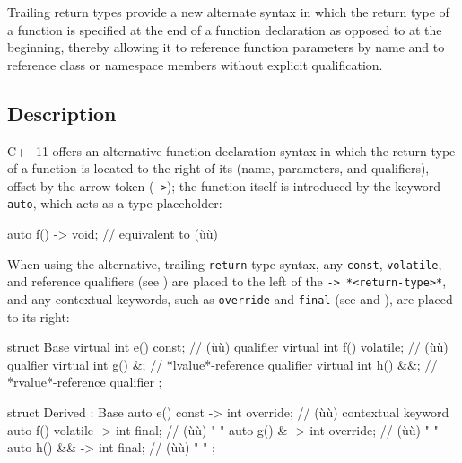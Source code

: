 
Trailing return types provide a new alternate syntax in which the return type of a function is specified at
the end of a function declaration as opposed to at the beginning,
thereby allowing it to reference function parameters by name and to reference class
or namespace members without explicit qualification.

\subsection[Description]{Description}\label{description}

C++11 offers an alternative function-declaration syntax in which the
return type of a function is located to the right of its
 (name, parameters, and qualifiers), offset by the
arrow token (\lstinline!->!); the function itself is introduced by the
keyword \lstinline!auto!, which acts as a type placeholder:
%

\begin{emcppslisting}
auto f() -> void;  // equivalent to (ù{}ù)
\end{emcppslisting}

When using the alternative, trailing-\lstinline!return!-type syntax, any \lstinline!const!,
\lstinline!volatile!, and reference qualifiers (see
) are placed to the left of
the \lstinline!->!~\lstinline!*<return-type>*!, and any contextual keywords, such as
\lstinline!override! and \lstinline!final! (see
and
), are placed to its right:

\begin{emcppslisting}
struct Base
{
    virtual int e() const;     // (ù{}ù) qualifier
    virtual int f() volatile;  // (ù{}ù) qualfier
    virtual int g() &;         // *lvalue*-reference qualifier
    virtual int h() &&;        // *rvalue*-reference qualifier
};

struct Derived : Base
{
    auto e() const    -> int override;  //  (ù{}ù) contextual keyword
    auto f() volatile -> int final;     //  (ù{}ù)         "        "
    auto g() &        -> int override;  //  (ù{}ù)      "        "
    auto h() &&       -> int final;     //  (ù{}ù)         "        "
};
\end{emcppslisting}

